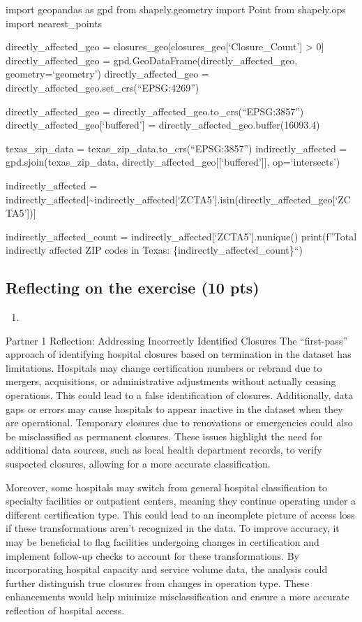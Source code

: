 \documentclass[
  letterpaper,
  DIV=11,
  numbers=noendperiod]{scrartcl}
\providecommand{\tightlist}{%
  \setlength{\itemsep}{0pt}\setlength{\parskip}{0pt}}\usepackage{longtable,booktabs,array}
\begin{document}
import geopandas as gpd from shapely.geometry import Point from
shapely.ops import nearest\_points

directly\_affected\_geo =
closures\_geo{[}closures\_geo{[}`Closure\_Count'{]} \textgreater{} 0{]}
directly\_affected\_geo = gpd.GeoDataFrame(directly\_affected\_geo,
geometry=`geometry') directly\_affected\_geo =
directly\_affected\_geo.set\_crs(``EPSG:4269'')

directly\_affected\_geo = directly\_affected\_geo.to\_crs(``EPSG:3857'')
directly\_affected\_geo{[}`buffered'{]} =
directly\_affected\_geo.buffer(16093.4)

texas\_zip\_data = texas\_zip\_data.to\_crs(``EPSG:3857'')
indirectly\_affected = gpd.sjoin(texas\_zip\_data,
directly\_affected\_geo{[}{[}`buffered'{]}{]}, op=`intersects')

indirectly\_affected =
indirectly\_affected{[}\textasciitilde indirectly\_affected{[}`ZCTA5'{]}.isin(directly\_affected\_geo{[}`ZCTA5'{]}){]}

indirectly\_affected\_count =
indirectly\_affected{[}`ZCTA5'{]}.nunique() print(f''Total indirectly
affected ZIP codes in Texas: \{indirectly\_affected\_count\}``)

\subsection{Reflecting on the exercise (10
pts)}\label{reflecting-on-the-exercise-10-pts}

\begin{enumerate}
\def\labelenumi{\arabic{enumi}.}
\tightlist
\item
\end{enumerate}

Partner 1 Reflection: Addressing Incorrectly Identified Closures The
``first-pass'' approach of identifying hospital closures based on
termination in the dataset has limitations. Hospitals may change
certification numbers or rebrand due to mergers, acquisitions, or
administrative adjustments without actually ceasing operations. This
could lead to a false identification of closures. Additionally, data
gaps or errors may cause hospitals to appear inactive in the dataset
when they are operational. Temporary closures due to renovations or
emergencies could also be misclassified as permanent closures. These
issues highlight the need for additional data sources, such as local
health department records, to verify suspected closures, allowing for a
more accurate classification.

Moreover, some hospitals may switch from general hospital classification
to specialty facilities or outpatient centers, meaning they continue
operating under a different certification type. This could lead to an
incomplete picture of access loss if these transformations aren't
recognized in the data. To improve accuracy, it may be beneficial to
flag facilities undergoing changes in certification and implement
follow-up checks to account for these transformations. By incorporating
hospital capacity and service volume data, the analysis could further
distinguish true closures from changes in operation type. These
enhancements would help minimize misclassification and ensure a more
accurate reflection of hospital access.
\end{document}

